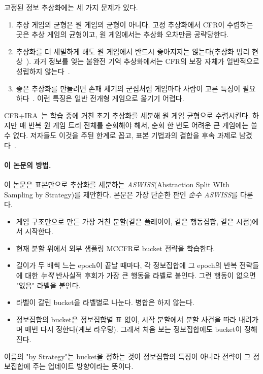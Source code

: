 고정된 정보 추상화에는 세 가지 문제가 있다.
\begin{enumerate}
  \item 추상 게임의 균형은 원 게임의 균형이 아니다. 고정 추상화에서 CFR이 수렴하는 곳은 추상 게임의 균형이고, 원 게임에서는 추상화 오차만큼 공략당한다.
  \item 추상화를 더 세밀하게 해도 원 게임에서 반드시 좋아지지는 않는다(추상화 병리 현상~\citep{waugh2009abstraction}).
    과거 정보를 잊는 불완전 기억 추상화에서는 CFR의 보장 자체가 일반적으로 성립하지 않는다~\citep{lanctot2012no}.
  \item 좋은 추상화를 만들려면 손패 세기의 군집처럼 게임마다 사람이 고른 특징이 필요하다~\citep{johanson2013evaluating,ganzfried2014potential}. 이런 특징은 일반 전개형 게임으로 옮기기 어렵다.
\end{enumerate}

CFR+IRA~\citep{cermak2020automated}는 학습 중에 거친 초기 추상화를 세분해 원 게임 균형으로 수렴시킨다.
하지만 매 반복 원 게임 트리 전체를 순회해야 해서, 순회 한 번도 어려운 큰 게임에는 쓸 수 없다.
저자들도 이것을 주된 한계로 꼽고, 표본 기법과의 결합을 후속 과제로 남겼다~\citep[6.1절]{cermak2020automated}.

\paragraph{이 논문의 방법.}
이 논문은 표본만으로 추상화를 세분하는 \emph{ASWISS}(Abstraction Split WIth Sampling by Strategy)를 제안한다. 본문은 가장 단순한 판인 \emph{순수 ASWISS}를 다룬다.
\begin{itemize}
  \item 게임 구조만으로 만든 가장 거친 분할(같은 플레이어, 같은 행동집합, 같은 시점)에서 시작한다.
  \item 현재 분할 위에서 외부 샘플링 MCCFR로 bucket 전략을 학습한다.
  \item 길이가 두 배씩 느는 epoch이 끝날 때마다, 각 정보집합에 그 epoch의 반복 전략들에 대한 \emph{누적} 반사실적 후회가 가장 큰 행동을 라벨로 붙인다. 그런 행동이 없으면 "없음" 라벨을 붙인다.
  \item 라벨이 갈린 bucket을 라벨별로 나눈다. 병합은 하지 않는다.
  \item 정보집합의 bucket은 정보집합별 표 없이, 시작 분할에서 분할 사건을 따라 내려가며 매번 다시 정한다(계보 라우팅). 그래서 처음 보는 정보집합에도 bucket이 정해진다.
\end{itemize}
이름의 "by Strategy"는 bucket을 정하는 것이 정보집합의 특징이 아니라 전략이 그 정보집합에 주는 업데이트 방향이라는 뜻이다.

